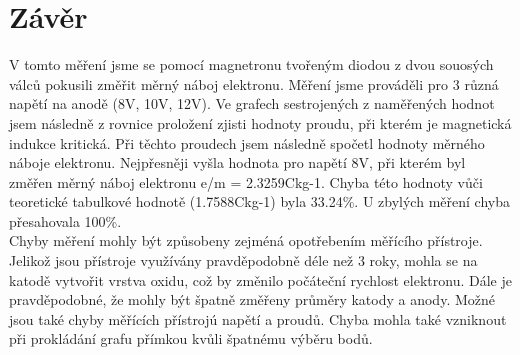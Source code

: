 \documentclass{praktikum}
\begin{document}
\begin{table}[H]
\centering
{}
\caption{Použité měřící přístroje}
\label{tab:merici_pristroje}
\end{table}

\section{Závěr}
V tomto měření jsme se pomocí magnetronu tvořeným diodou z dvou souosých válců pokusili změřit měrný náboj elektronu. Měření jsme prováděli pro 3 různá napětí na anodě (8V, 10V, 12V). Ve grafech sestrojených z naměřených hodnot jsem následně z rovnice proložení zjisti hodnoty proudu, při kterém je magnetická indukce kritická. Při těchto proudech jsem následně spočetl hodnoty měrného náboje elektronu. Nejpřesněji vyšla hodnota pro napětí 8V, při kterém byl změřen měrný náboj elektronu e/m = 2.3259Ckg-1. Chyba této hodnoty vůči teoretické tabulkové hodnotě (1.7588Ckg-1) byla 33.24\%. U zbylých měření chyba přesahovala 100\%.\\

\indent Chyby měření mohly být způsobeny zejméná opotřebením měřícího přístroje. Jelikož jsou přístroje využívány pravděpodobně déle než 3 roky, mohla se na katodě vytvořit vrstva oxidu, což by změnilo počáteční rychlost elektronu. Dále je pravděpodobné, že mohly být špatně změřeny průměry katody a anody. Možné jsou také chyby měřících přístrojú napětí a proudů. Chyba mohla také vzniknout při prokládání grafu přímkou kvůli špatnému výběru bodů.
\end{document}
